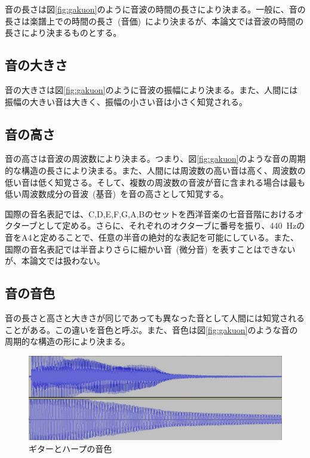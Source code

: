 音の長さは図\ref{fig:gakuon}のように音波の時間の長さにより決まる。一般に、音の長さは楽譜上での時間の長さ~(音価)~により決まるが、本論文では音波の時間の長さにより決まるものとする。

\subsection{音の大きさ}

音の大きさは図\ref{fig:gakuon}のように音波の振幅により決まる。また、人間には振幅の大きい音は大きく、振幅の小さい音は小さく知覚される。

\subsection{音の高さ}

音の高さは音波の周波数により決まる。つまり、図\ref{fig:gakuon}のような音の周期的な構造の長さにより決まる。また、人間には周波数の高い音は高く、周波数の低い音は低く知覚さる。そして、複数の周波数の音波が音に含まれる場合は最も低い周波数成分の音波~(基音)~を音の高さとして知覚する。

国際の音名表記では、C,D,E,F,G,A,Bのセットを西洋音楽の七音音階におけるオクターブとして定める。さらに、それぞれのオクターブに番号を振り、440~Hzの音をA4と定めることで、任意の半音の絶対的な表記を可能にしている。また、国際の音名表記では半音よりさらに細かい音~(微分音)~を表すことはできないが、本論文では扱わない。

\subsection{音の音色}

音の長さと高さと大きさが同じであっても異なった音として人間には知覚されることがある。この違いを音色と呼ぶ。また、音色は図\ref{fig:gakuon}のような音の周期的な構造の形により決まる。

\begin{figure}[t]
\begin{center}
\includegraphics[width=\hsize]{figure/c4_guitar_harp.png}
\caption{ギターとハープの音色}
\label{fig:guitar_harp_comp}
\end{center}
\end{figure}

